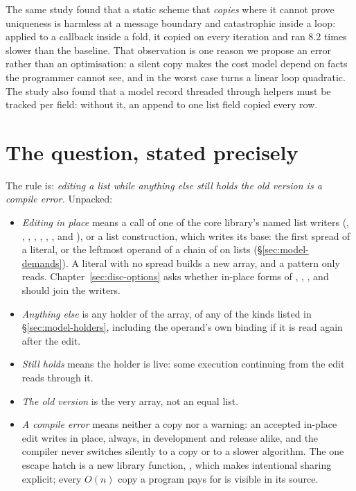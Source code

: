The same study found that a static scheme that \emph{copies} where it cannot prove uniqueness is
harmless at a message boundary and catastrophic inside a loop: applied to a callback inside a fold,
it copied on every iteration and ran 8.2 times slower than the baseline. That observation is one
reason we propose an error rather than an optimisation: a silent copy makes the cost model depend
on facts the programmer cannot see, and in the worst case turns a linear loop quadratic. The study
also found that a model record threaded through helpers must be tracked per field: without it, an
append to one list field copied every row.

\section{The question, stated precisely}
\label{sec:bg-question}

The rule is: \emph{editing a list while anything else still holds the old version is a compile
error.} Unpacked:

\begin{itemize}
\item \emph{Editing in place} means a call of one of the core library's named list writers
(, , , , , , ,
 and ), or a list construction, which writes its base: the first spread of a
literal, or the leftmost operand of a chain of \code{++} on lists (\S\ref{sec:model-demands}). A literal with no spread
builds a new array, and a pattern only reads. Chapter~\ref{sec:disc-options} asks whether in-place
forms of , , ,  and  should join the writers.
\item \emph{Anything else} is any holder of the array, of any of the kinds listed in
\S\ref{sec:model-holders}, including the operand's own binding if it is read again after the edit.
\item \emph{Still holds} means the holder is live: some execution continuing from the edit reads
through it.
\item \emph{The old version} is the very array, not an equal list.
\item \emph{A compile error} means neither a copy nor a warning: an accepted in-place edit writes in
place, always, in development and release alike, and the compiler never switches silently to a copy
or to a slower algorithm. The one escape hatch is a new library function, , which makes
intentional sharing explicit; every $O(n)$ copy a program pays for is visible in its source.
\end{itemize}

